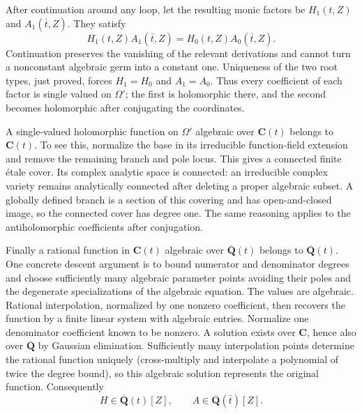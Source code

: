 After continuation around any loop, let the resulting monic
factors be $H_1(t,Z)$ and $A_1(\bar t,Z)$. They satisfy
\[
 H_1(t,Z)A_1(\bar t,Z)=H_0(t,Z)A_0(\bar t,Z).
\]
Continuation preserves the vanishing of the relevant derivations
and cannot turn a nonconstant algebraic germ into a constant one.
Uniqueness of the two root types, just proved, forces $H_1=H_0$
and $A_1=A_0$. Thus every coefficient of each factor is single
valued on $\Omega'$; the first is holomorphic there, and the
second becomes holomorphic after conjugating the coordinates.

A single-valued holomorphic function on $\Omega'$ algebraic over
$\mathbf C(t)$ belongs to $\mathbf C(t)$. To see this, normalize
the base in its irreducible function-field extension and remove
the remaining branch and pole locus. This gives a connected
finite \'etale cover. Its complex analytic space is connected:
an irreducible complex variety remains analytically connected
after deleting a proper algebraic subset. A globally defined
branch is a section of this covering and has open-and-closed
image, so the connected cover has degree one. The same reasoning
applies to the antiholomorphic coefficients after conjugation.

Finally a rational function in $\mathbf C(t)$ algebraic over
$\overline{\mathbf Q}(t)$ belongs to
$\overline{\mathbf Q}(t)$. One concrete descent argument is to
bound numerator and denominator degrees and choose sufficiently
many algebraic parameter points avoiding their poles and the
degenerate specializations of the algebraic equation. The values
are algebraic. Rational interpolation, normalized by one nonzero
coefficient, then recovers the function by a finite linear system
with algebraic entries. Normalize one denominator coefficient
known to be nonzero. A solution exists over $\mathbf C$, hence
also over $\overline{\mathbf Q}$ by Gaussian elimination.
Sufficiently many interpolation points determine the rational
function uniquely (cross-multiply and interpolate a polynomial
of twice the degree bound), so this algebraic solution represents
the original function. Consequently
\[
 H\in\overline{\mathbf Q}(t)[Z],\qquad
 A\in\overline{\mathbf Q}(\bar t)[Z].
\]

